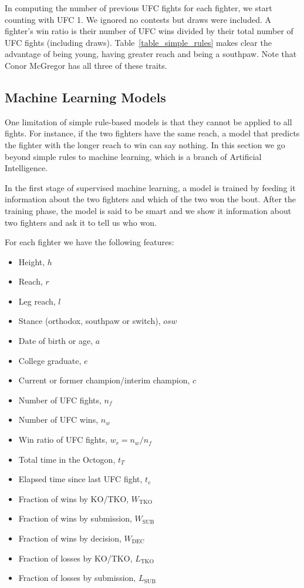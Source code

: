 In computing the number of previous UFC fights for each fighter, we start
counting with UFC 1. We ignored no contests but draws were included. A fighter's
win ratio is their number of UFC wins divided by their
total number of UFC fights (including draws).
Table~\ref{table_simple_rules} makes clear the advantage of being young, having
greater reach and being a southpaw.  Note that Conor McGregor has all three of
these traits.

\subsection*{Machine Learning Models}

One limitation of simple rule-based models is that they
cannot be applied to all fights. For instance, if the two fighters
have the same reach, a model that predicts the fighter with the longer
reach to win can say nothing.
In this section we go beyond simple rules to machine learning,
which is a branch of Artificial Intelligence.

In the first stage of supervised machine learning, a model
is trained by feeding it information about the two fighters
and which of the two won the bout. After the training phase,
the model is said to be smart and we show it information about
two fighters and ask it to tell us who won.

For each fighter we have the following features:

\begin{itemize}[noitemsep]
  \item Height, $h$
  \item Reach, $r$
  \item Leg reach, $l$
  \item Stance (orthodox, southpaw or switch), $osw$
  \item Date of birth or age, $a$
  \item College graduate, $e$
  \item Current or former champion/interim champion, $c$
  \item Number of UFC fights, $n_f$
  \item Number of UFC wins, $n_w$
  \item Win ratio of UFC fights, $w_r=n_w/n_f$
  \item Total time in the Octogon, $t_T$
  \item Elapsed time since last UFC fight, $t_e$
  \item Fraction of wins by KO/TKO, $W_{\textrm{TKO}}$
  \item Fraction of wins by submission, $W_{\textrm{SUB}}$
  \item Fraction of wins by decision, $W_{\textrm{DEC}}$
  \item Fraction of losses by KO/TKO, $L_{\textrm{TKO}}$
  \item Fraction of losses by submission, $L_{\textrm{SUB}}$
\end{itemize}

